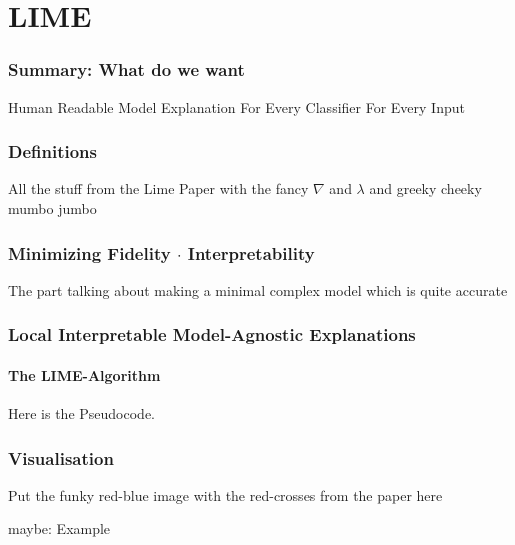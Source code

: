 \section{LIME}
\begin{frame}
	\frametitle{Summary: What do we want}
	Human Readable Model Explanation
	For Every Classifier
	For Every Input
\end{frame}

\begin{frame}
	\frametitle{Definitions}
	All the stuff from the Lime Paper with the fancy $\nabla$ and $\lambda$ and greeky cheeky mumbo jumbo
\end{frame}

\begin{frame}
	\frametitle{Minimizing Fidelity $\cdot$ Interpretability}
	The part talking about making a minimal complex model which is quite accurate
\end{frame}

\begin{frame}
	\frametitle{Local Interpretable Model-Agnostic Explanations}
	\framesubtitle{The LIME-Algorithm}
	Here is the Pseudocode. 
\end{frame}
\begin{frame}
	\frametitle{Visualisation}
	Put the funky red-blue image with the red-crosses from the paper here
\end{frame}

\begin{frame}
	maybe: Example 
\end{frame}